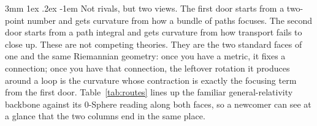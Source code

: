 \documentclass[%
 reprint, amsmath,amssymb, aps, prb, ]{revtex4-2}
\makeatletter
\numberwithin{equation}{section}
\renewcommand\paragraph{%
  \@startsection{paragraph}{4}{\z@}%
    {3mm \@plus 1ex \@minus .2ex}%
    {-1em}%
    {\normalfont\normalsize\itshape}}
\makeatother
\begin{document}
\paragraph{Not rivals, but two views.}
The first door starts from a two-point number and gets curvature from how a bundle of paths focuses. The second door starts from a path integral and gets curvature from how transport fails to close up. These are not competing theories. They are the two standard faces of one and the same Riemannian geometry: once you have a metric, it fixes a connection; once you have that connection, the leftover rotation it produces around a loop is the curvature whose contraction is exactly the focusing term from the first door. Table~\ref{tab:routes} lines up the familiar general-relativity backbone against its 0-Sphere reading along both faces, so a newcomer can see at a glance that the two columns end in the same place.
\end{document}
